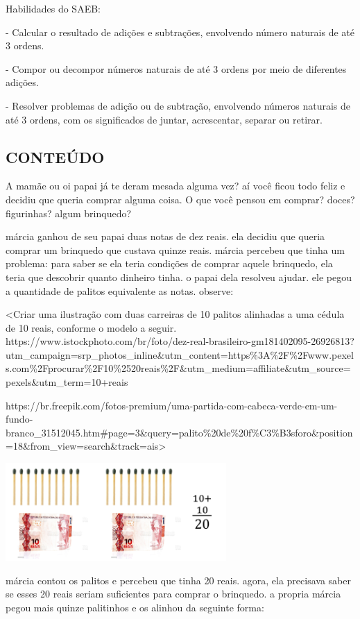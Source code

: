Habilidades do SAEB:

- Calcular o resultado de adições e subtrações, envolvendo número
naturais de até 3 ordens.

- Compor ou decompor números naturais de até 3 ordens por meio de
diferentes adições.

- Resolver problemas de adição ou de subtração, envolvendo números
naturais de até 3 ordens, com os significados de juntar, acrescentar,
separar ou retirar.

\subsection{CONTEÚDO}\label{conteuxfado-1}

A mamãe ou oi papai já te deram mesada alguma vez? aí você ficou todo
feliz e decidiu que queria comprar alguma coisa. O que você pensou em
comprar? doces? figurinhas? algum brinquedo?

márcia ganhou de seu papai duas notas de dez reais. ela decidiu que
queria comprar um brinquedo que custava quinze reais. márcia percebeu
que tinha um problema: para saber se ela teria condições de comprar
aquele brinquedo, ela teria que descobrir quanto dinheiro tinha. o papai
dela resolveu ajudar. ele pegou a quantidade de palitos equivalente as
notas. observe:

\textless{}Criar uma ilustração com duas carreiras de 10 palitos
alinhadas a uma cédula de 10 reais, conforme o modelo a seguir.
https://www.istockphoto.com/br/foto/dez-real-brasileiro-gm181402095-26926813?utm\_campaign=srp\_photos\_inline\&utm\_content=https\%3A\%2F\%2Fwww.pexels.com\%2Fprocurar\%2F10\%2520reais\%2F\&utm\_medium=affiliate\&utm\_source=pexels\&utm\_term=10+reais

https://br.freepik.com/fotos-premium/uma-partida-com-cabeca-verde-em-um-fundo-branco\_31512045.htm\#page=3\&query=palito\%20de\%20f\%C3\%B3sforo\&position=18\&from\_view=search\&track=ais\textgreater{}

\includegraphics[width=3.31224in,height=1.46877in]{media/image13.png}

márcia contou os palitos e percebeu que tinha 20 reais. agora, ela
precisava saber se esses 20 reais seriam suficientes para comprar o
brinquedo. a propria márcia pegou mais quinze palitinhos e os alinhou da
seguinte forma:

